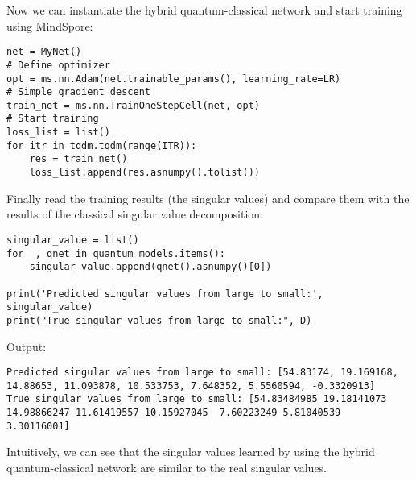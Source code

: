 Now we can instantiate the hybrid quantum-classical network and start training using MindSpore:
\begin{lstlisting}
net = MyNet()
# Define optimizer
opt = ms.nn.Adam(net.trainable_params(), learning_rate=LR)
# Simple gradient descent
train_net = ms.nn.TrainOneStepCell(net, opt)
# Start training
loss_list = list()
for itr in tqdm.tqdm(range(ITR)):
    res = train_net()
    loss_list.append(res.asnumpy().tolist())
\end{lstlisting}
Finally read the training results (the singular values) and compare them with the results of the classical singular value decomposition:
\begin{lstlisting}
singular_value = list()
for _, qnet in quantum_models.items():
    singular_value.append(qnet().asnumpy()[0])

print('Predicted singular values from large to small:', singular_value)
print("True singular values from large to small:", D)
\end{lstlisting}
Output:
\begin{lstlisting}
Predicted singular values from large to small: [54.83174, 19.169168, 14.88653, 11.093878, 10.533753, 7.648352, 5.5560594, -0.3320913]
True singular values from large to small: [54.83484985 19.18141073 14.98866247 11.61419557 10.15927045  7.60223249 5.81040539  3.30116001]
\end{lstlisting}
Intuitively, we can see that the singular values learned by using the hybrid quantum-classical network are similar to the real singular values.
